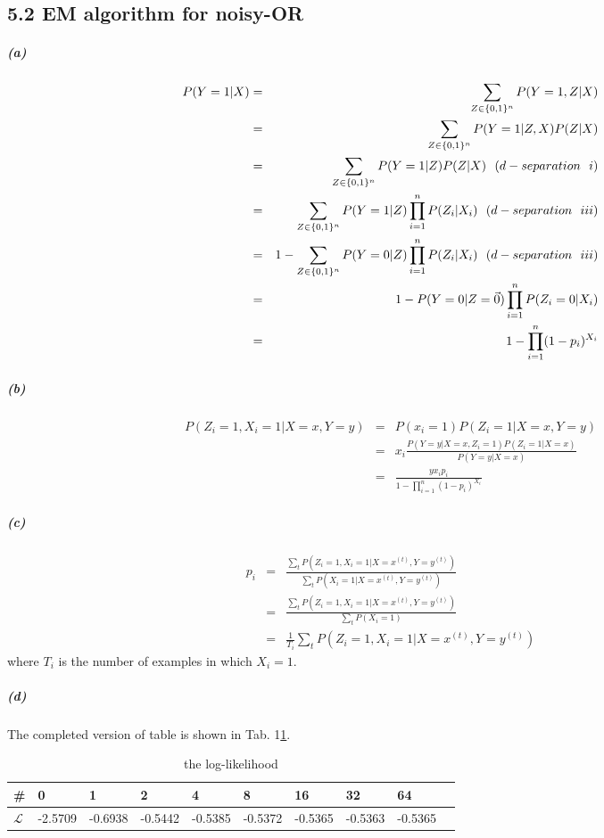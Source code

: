 \documentclass{article}
\newcommand{\RNum}[1]{\uppercase\expandafter{\romannumeral #1\relax}}
\begin{document}
\subsection*{5.2 EM algorithm for noisy-OR}
\subparagraph*{(a)}
\begin{eqnarray*}
	P(Y = 1| X) &=& \sum_{Z \in \{0,1\}^n}P(Y =1 ,Z | X)\\	
	&=& \sum_{Z \in \{0,1\}^n}P(Y =1 |Z , X) P(Z|X)\\
	&=& \sum_{Z \in \{0,1\}^n}P(Y=1|Z)P(Z|X)~~(d-separation~~\RNum{1})\\
	&=& \sum_{Z \in \{0,1\}^n}P(Y=1|Z)\prod_{i=1}^{n}P(Z_i|X_i)~~(d-separation~~\RNum{3})\\
	&=& 1- \sum_{Z \in \{0,1\}^n}P(Y=0|Z)\prod_{i=1}^{n}P(Z_i|X_i)~~(d-separation~~\RNum{3})\\
	&=& 1- P(Y=0|Z=\vec{0})\prod_{i=1}^{n}P(Z_i=0|X_i)\\
	&=& 1 - \prod_{i=1}^{n}(1-p_i)^{X_i}
\end{eqnarray*}

\subparagraph*{(b)}
\begin{eqnarray*}
	P(Z_i = 1, X_i = 1| X=x, Y=y) &=& P(x_i = 1)P(Z_i = 1|X=x, Y=y)\\
	&=& x_i \frac{P(Y=y|X=x, Z_i = 1)P(Z_i = 1|X=x)}{P(Y=y|X=x)}\\
	&=& \frac{y x_i p_i}{1 - \prod_{i=1}^{n}(1-p_i)^{X_i}}
\end{eqnarray*}

\subparagraph*{(c)}
\begin{eqnarray*}
	p_i &=& \frac{\sum_{t}P(Z_i=1, X_i=1| X=x^{(t)}, Y=y^{(t)})}{\sum_{t}P(X_i=1| X=x^{(t)}, Y=y^{(t)})}\\
	&=& \frac{\sum_{t}P(Z_i=1, X_i=1| X=x^{(t)}, Y=y^{(t)})}{\sum_{t}P(X_i=1)}\\
	&=& \frac{1}{T_i}\sum_{t}P(Z_i=1, X_i=1| X=x^{(t)}, Y=y^{(t)})
\end{eqnarray*}
where $T_i$ is the number of examples in which $X_i=1$.

\subparagraph*{(d)}
The completed version of table is shown in Tab. 1\ref{hw5.2}.
\begin{table}
	\centering
	\begin{tabular}{|p{1.2cm}|p{1.2cm}|p{1.2cm}|p{1.2cm}|p{1.2cm}|p{1.2cm}|p{1.2cm}|p{1.2cm}|p{1.2cm}|p{1.2cm}|}
		\hline
		\#  & 0 & 1 & 2 & 4 & 8 & 16 & 32 & 64\\
		\hline 
		 $\mathcal{L}$& -2.5709 & -0.6938 & -0.5442 & -0.5385 & -0.5372 & -0.5365 & -0.5363 & -0.5365\\
		\hline
	\end{tabular}
	\label{hw5.2}
	\caption{the log-likelihood}
\end{table}
\end{document}
